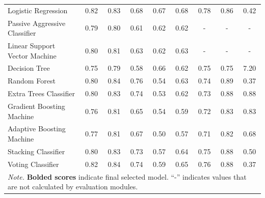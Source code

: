 \documentclass[Royal,sageapa,times]{sagej}
\begin{document}
\begin{landscape}
\begin{longtable}[l]{lcccccccc}
    Logistic Regression & 0.82 & 0.83 & 0.68 & 0.67 & 0.68 & 0.78 & 0.86 & 0.42 \\
    Passive Aggressive Classifier & 0.79 & 0.80 & 0.61 & 0.62 & 0.62 & - & - & - \\
    Linear Support Vector Machine & 0.80 & 0.81 & 0.63 & 0.62 & 0.63 & - & - & - \\
    Decision Tree & 0.75 & 0.79 & 0.58 & 0.66 & 0.62 & 0.75 & 0.75 & 7.20 \\
    Random Forest & 0.80 & 0.84 & 0.76 & 0.54 & 0.63 & 0.74 & 0.89 & 0.37 \\
    Extra Trees Classifier & 0.80 & 0.83 & 0.74 & 0.53 & 0.62 & 0.73 & 0.88 & 0.88 \\
    Gradient Boosting Machine & 0.76 & 0.81 & 0.65 & 0.54 & 0.59 & 0.72 & 0.83 & 0.83 \\
    Adaptive Boosting Machine & 0.77 & 0.81 & 0.67 & 0.50 & 0.57 & 0.71 & 0.82 & 0.68 \\
    Stacking Classifier & 0.80 & 0.83 & 0.73 & 0.57 & 0.64 & 0.75 & 0.88 & 0.50 \\
    Voting Classifier & 0.82 & 0.84 & 0.74 & 0.59 & 0.65 & 0.76 & 0.88 & 0.37 \\ \hline
    \multicolumn{9}{l}{\textit{Note.} \textbf{Bolded scores} indicate final selected model. “-” indicates values that are not calculated by evaluation modules.}
    \end{longtable}
\end{landscape}
\end{document}
